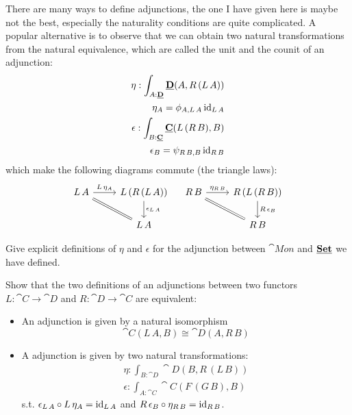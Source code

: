 There are many ways to define adjunctions, the one I have given here is maybe not the best, especially the naturality conditions are quite complicated. A popular alternative is to observe that we can obtain two natural transformations from the natural equivalence, which are called the unit and the counit of an adjunction:
\begin{align*}
  \eta : \int_{A:\underline{\mathbf{D}}} \underline{\mathbf{D}}(A,R\,(L\,A)) \\
  \eta_A = \phi_{A,L\,A}\,\mathrm{id}_{L\,A} \\
  \epsilon : \int_{B:\underline{\mathbf{C}}} \underline{\mathbf{C}}(L\,(R\,B),B) \\
  \epsilon_B = \psi_{R\,B,B}\,\mathrm{id}_{R\,B}
\end{align*}
which make the following diagrams commute (the triangle laws):
\[\begin{tikzcd}
L\,A \arrow[rd,equal] \arrow[r,"L\,\eta_{A}"] &   L\,(R\,(L\,A))\arrow[d,"\epsilon_{L\,A}"]\\
& L\,A
\end{tikzcd}
\quad
\begin{tikzcd}
R\,B \arrow[rd,equal] \arrow[r,"\eta_{R\,B}"] &   R\,(L\,(R\,B)) \arrow[d,"R\,\epsilon_B"]\\
& R\,B
\end{tikzcd}
\]

\begin{Exercise}
 Give explicit definitions of $\eta$ and $\epsilon$ for the adjunction between $\cat{Mon}$ and $\underline{\mathbf{\mathbf{Set}}}$ we have defined.
\end{Exercise}

\begin{Exercise}
  Show that the two definitions of an adjunctions between two functors $L : \cat{C} \to \cat{D}$ and $R : \cat{D} \to \cat{C}$ are equivalent: 
  \begin{itemize}
  \item An adjunction is given by a natural isomorphism 
    \[ \cat{C}(L\,A,B)  \cong \cat{D}(A,R\,B)  \]
  \item A adjunction is given by two natural transformations: 
    \begin{align*}
      \eta : \int_{B:\cat{D}} \cat{D}(B,R\,(L\,B))\\
      \epsilon : \int_{A:\cat{C}} \cat{C}(F\,(G\,B),B) 
    \end{align*}
    s.t. $\epsilon_{L\,A} \circ L\,\eta_A = \mathrm{id}_{L\,A}$ and $R\,\epsilon_B \circ \eta_{R\,B} = \mathrm{id}_{R\,B}$.
  \end{itemize}
\end{Exercise}

